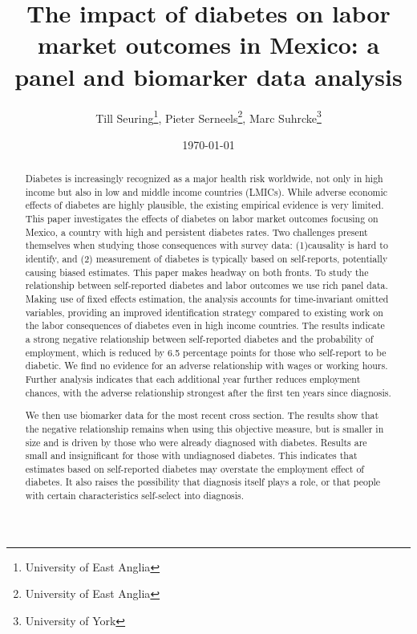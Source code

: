 \documentclass[12pt,english,british]{article}
\begin{document}
\title{The impact of diabetes on labor market outcomes in Mexico: a panel and biomarker data analysis}

\author{Till Seuring\footnote{University of East Anglia}, Pieter
Serneels\footnote{University of East Anglia}, Marc Suhrcke\footnote{University
  of York}}
\affil{}

\date{\today}


\maketitle 


\begin{abstract}
Diabetes is increasingly recognized as a major health risk worldwide, not only in high income but also in low and middle income countries (LMICs). While adverse economic effects of diabetes are highly plausible, the existing empirical evidence is very limited. This paper investigates the effects of diabetes on labor market outcomes focusing on Mexico, a country with high and persistent diabetes rates. Two challenges present themselves when studying those consequences with survey data: (1)causality is hard to identify, and (2) measurement of diabetes is typically based on self-reports, potentially causing biased estimates. This paper makes headway on both fronts. To study the relationship between self-reported diabetes and labor outcomes we use rich panel data. Making use of fixed effects estimation, the analysis accounts for time-invariant omitted variables, providing an improved identification strategy compared to existing work on the labor consequences of diabetes even in high income countries. The results indicate a strong negative relationship between self-reported diabetes and the probability of employment, which is reduced by 6.5 percentage points for those who self-report to be diabetic. We find no evidence for an adverse relationship with wages or working hours. Further analysis indicates that each additional year further reduces employment chances, with the adverse relationship strongest after the first ten years since diagnosis. 

We then use biomarker data for the most recent cross section. The results show that the negative relationship remains when using this objective measure, but is smaller in size and is driven by those who were already diagnosed with diabetes. Results are small and insignificant for those with undiagnosed diabetes. This indicates that estimates based on self-reported diabetes may overstate the employment effect of diabetes. It also raises the possibility that diagnosis itself plays a role, or that people with certain characteristics self-select into diagnosis. 


\end{abstract}
\end{document}
